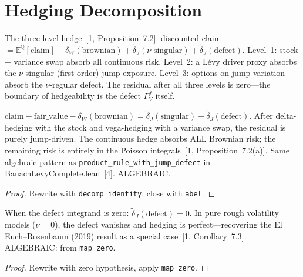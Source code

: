 \section{Hedging Decomposition}

\begin{defn}\label{def:HedgingDecomposition}
\leanok
{}
The three-level hedge~[1, Proposition~7.2]: discounted claim $= \mathbb{E}^\mathbb{Q}[\text{claim}] + \delta_W(\text{brownian}) + \tilde{\delta}_J(\nu\text{-singular}) + \tilde{\delta}_J(\text{defect})$. Level~1: stock + variance swap absorb all continuous risk. Level~2: a L\'evy driver proxy absorbs the $\nu$-singular (first-order) jump exposure. Level~3: options on jump variation absorb the $\nu$-regular defect. The residual after all three levels is zero---the boundary of hedgeability is the defect $\Gamma_V^f$ itself.
\end{defn}

\begin{theorem}\label{thm:continuous_hedge_absorbs_brownian}
\leanok
{}
$\text{claim} - \text{fair\_value} - \delta_W(\text{brownian}) = \tilde{\delta}_J(\text{singular}) + \tilde{\delta}_J(\text{defect})$. After delta-hedging with the stock and vega-hedging with a variance swap, the residual is purely jump-driven. The continuous hedge absorbs ALL Brownian risk; the remaining risk is entirely in the Poisson integrals~[1, Proposition~7.2(a)]. Same algebraic pattern as \texttt{product\_rule\_with\_jump\_defect} in BanachLevyComplete.lean~[4]. ALGEBRAIC.
\end{theorem}
\begin{proof}\leanok Rewrite with \texttt{decomp\_identity}, close with \texttt{abel}.\end{proof}

\begin{theorem}\label{thm:perfect_hedging_without_jumps}
\leanok
{}
When the defect integrand is zero: $\tilde{\delta}_J(\text{defect}) = 0$. In pure rough volatility models ($\nu = 0$), the defect vanishes and hedging is perfect---recovering the El Euch--Rosenbaum (2019) result as a special case~[1, Corollary~7.3]. ALGEBRAIC: from \texttt{map\_zero}.
\end{theorem}
\begin{proof}\leanok Rewrite with zero hypothesis, apply \texttt{map\_zero}.\end{proof}

